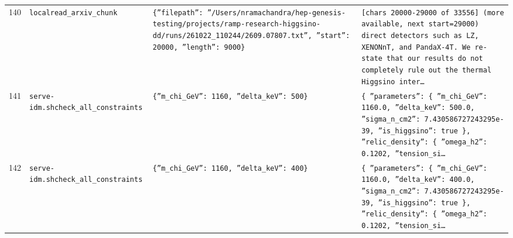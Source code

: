 \documentclass[11pt,a4paper]{article}
\begin{document}
\begin{longtable}{@{}p{}p{}p{}p{}@{}}
140 & \texttt{local}\newline\texttt{read\_\allowbreak{}arxiv\_\allowbreak{}chunk} & \texttt{\{''filepath'':\allowbreak{} ''/\allowbreak{}Users/\allowbreak{}nramachandra/\allowbreak{}hep-genesis-testing/\allowbreak{}projects/\allowbreak{}ramp-research-higgsino-dd/\allowbreak{}runs/\allowbreak{}261022\_\allowbreak{}110244/\allowbreak{}2609.07807.txt'',\allowbreak{} ''start'':\allowbreak{} 20000,\allowbreak{} ''length'':\allowbreak{} 9000\}\allowbreak{}} & \texttt{[chars 20000-29000 of 33556]\allowbreak{} (more available,\allowbreak{} next start=\allowbreak{}29000)\allowbreak{}  direct detectors such as LZ,\allowbreak{} XENONnT,\allowbreak{} and PandaX-4T. We re-state that our results do not completely rule out the thermal Higgsino inter\ldots{}\allowbreak{}} \\
141 & \texttt{serve-idm.sh}\newline\texttt{check\_\allowbreak{}all\_\allowbreak{}constraints} & \texttt{\{''m\_\allowbreak{}chi\_\allowbreak{}GeV'':\allowbreak{} 1160,\allowbreak{} ''delta\_\allowbreak{}keV'':\allowbreak{} 500\}\allowbreak{}} & \texttt{\{   ''parameters'':\allowbreak{} \{     ''m\_\allowbreak{}chi\_\allowbreak{}GeV'':\allowbreak{} 1160.0,\allowbreak{}     ''delta\_\allowbreak{}keV'':\allowbreak{} 500.0,\allowbreak{}     ''sigma\_\allowbreak{}n\_\allowbreak{}cm2'':\allowbreak{} 7.430586727243295e-39,\allowbreak{}     ''is\_\allowbreak{}higgsino'':\allowbreak{} true   \}\allowbreak{},\allowbreak{}   ''relic\_\allowbreak{}density'':\allowbreak{} \{     ''omega\_\allowbreak{}h2'':\allowbreak{} 0.1202,\allowbreak{}     ''tension\_\allowbreak{}si\ldots{}\allowbreak{}} \\
142 & \texttt{serve-idm.sh}\newline\texttt{check\_\allowbreak{}all\_\allowbreak{}constraints} & \texttt{\{''m\_\allowbreak{}chi\_\allowbreak{}GeV'':\allowbreak{} 1160,\allowbreak{} ''delta\_\allowbreak{}keV'':\allowbreak{} 400\}\allowbreak{}} & \texttt{\{   ''parameters'':\allowbreak{} \{     ''m\_\allowbreak{}chi\_\allowbreak{}GeV'':\allowbreak{} 1160.0,\allowbreak{}     ''delta\_\allowbreak{}keV'':\allowbreak{} 400.0,\allowbreak{}     ''sigma\_\allowbreak{}n\_\allowbreak{}cm2'':\allowbreak{} 7.430586727243295e-39,\allowbreak{}     ''is\_\allowbreak{}higgsino'':\allowbreak{} true   \}\allowbreak{},\allowbreak{}   ''relic\_\allowbreak{}density'':\allowbreak{} \{     ''omega\_\allowbreak{}h2'':\allowbreak{} 0.1202,\allowbreak{}     ''tension\_\allowbreak{}si\ldots{}\allowbreak{}} \\

\end{longtable}
\end{document}
